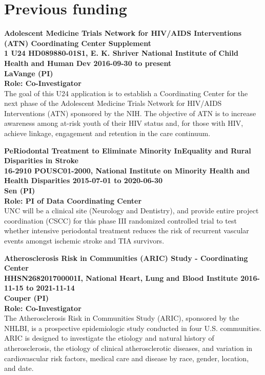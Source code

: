 \documentclass[10pt,letterpaper]{article}
\renewenvironment{itemize}{
  \begin{list}{}{
    \setlength{\leftmargin}{1.5em}
    \setlength{\itemsep}{0.25em}
    \setlength{\parskip}{0pt}
    \setlength{\parsep}{0.25em}
  }
}{
  \end{list}
}
\begin{document}
\section*{Previous funding}
\begin{itemize}
\item \textbf{Adolescent Medicine Trials Network for HIV/AIDS Interventions (ATN) Coordinating Center Supplement\\1 U24 HD089880-01S1, E. K. Shriver National Institute of Child Health and Human Dev 2016-09-30 to present\\
LaVange (PI)\\
Role: Co-Investigator\\}
The goal of this U24 application is to establish a Coordinating Center for the next phase of the Adolescent Medicine Trials Network for HIV/AIDS Interventions (ATN) sponsored by the NIH. The objective of ATN is to increase awareness among at-risk youth of their HIV status and, for those with HIV, achieve linkage, engagement and retention in the care continuum.\\

\item \textbf{PeRiodontal Treatment to Eliminate Minority InEquality and Rural Disparities in Stroke \\ 16-2910 POUSC01-2000, National Institute on Minority Health and Health Disparities 2015-07-01 to 2020-06-30\\ Sen (PI)\\
    Role: PI of Data Coordinating Center}\\
    UNC will be a clinical site (Neurology and Dentistry), and provide entire project coordination (CSCC) for this phase III randomized controlled trial to test whether intensive periodontal treatment reduces the risk of recurrent vascular events amongst ischemic stroke and TIA survivors.\\
    
    \item \textbf{Atherosclerosis Risk in Communities (ARIC) Study - Coordinating Center\\HHSN268201700001I, National Heart, Lung and Blood Institute 2016-11-15 to 2021-11-14\\
Couper (PI)\\
Role: Co-Investigator}\\
The Atherosclerosis Risk in Communities Study (ARIC), sponsored by the NHLBI, is a prospective epidemiologic study conducted in four U.S. communities. ARIC is designed to investigate the etiology and natural history of atherosclerosis, the etiology of clinical atherosclerotic diseases, and variation in cardiovascular risk factors, medical care and disease by race, gender, location, and date.\\


\end{itemize}
\end{document}
